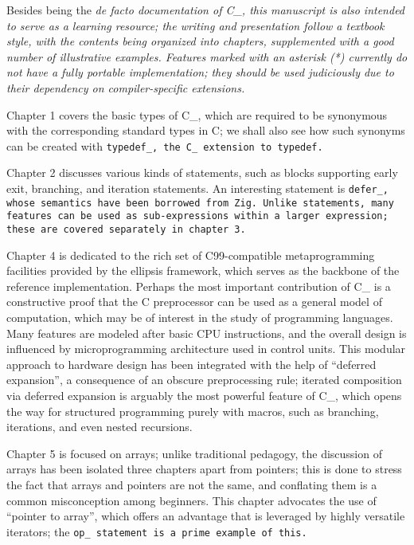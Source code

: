 Besides being the \it{de facto} documentation of C\_,
this manuscript is also intended to serve as a learning resource;
the writing and presentation follow a textbook style,
with the contents being organized into chapters,
supplemented with a good number of illustrative examples.
Features marked with an asterisk (*) currently
do not have a fully portable implementation;
they should be used judiciously due to their
dependency on compiler-specific extensions.

Chapter 1 covers the basic types of C\_, which are required
to be synonymous with the corresponding standard types in C;
we shall also see how such synonyms can be created with \tt{typedef_},
the C\_ extension to \tt{typedef}.

Chapter 2 discusses various kinds of statements, such as blocks
supporting early exit, branching, and iteration statements.
An interesting statement is \tt{defer_},
whose semantics have been borrowed from Zig.
Unlike statements, many features can be used as sub-expressions
within a larger expression; these are covered separately in chapter 3.

Chapter 4 is dedicated to the rich set of C99-compatible
metaprogramming facilities provided by the ellipsis framework,
which serves as the backbone of the reference implementation.
Perhaps the most important contribution of C\_ is a constructive proof
that the C preprocessor can be used as a general model of computation,
which may be of interest in the study of programming languages.
Many features are modeled after basic CPU instructions, and the overall design
is influenced by microprogramming architecture used in control units.
This modular approach to hardware design has been integrated with the help
of ``deferred expansion'', a consequence of an obscure preprocessing rule;
iterated composition via deferred expansion is arguably the most powerful
feature of C\_, which opens the way for structured programming purely with
macros, such as branching, iterations, and even nested recursions.

Chapter 5 is focused on arrays; unlike traditional pedagogy,
the discussion of arrays has been isolated three chapters apart from pointers;
this is done to stress the fact that arrays and pointers are not the same,
and conflating them is a common misconception among beginners.
This chapter advocates the use of ``pointer to array'',
which offers an advantage that is leveraged by highly versatile iterators;
the \tt{op_} statement is a prime example of this.

